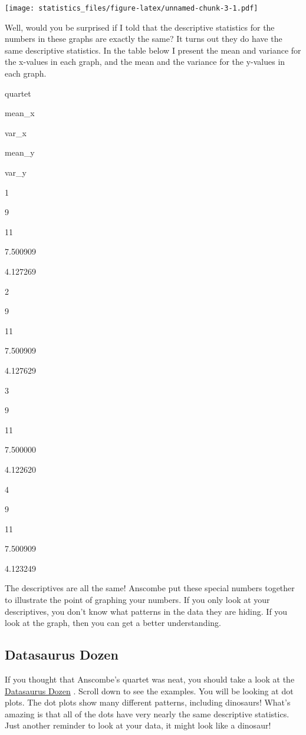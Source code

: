 \documentclass[]{book}
\begin{document}
\texttt{[image: statistics\_files/figure-latex/unnamed-chunk-3-1.pdf]}

Well, would you be surprised if I told that the descriptive statistics for the numbers in these graphs are exactly the same? It turns out they do have the same descriptive statistics. In the table below I present the mean and variance for the x-values in each graph, and the mean and the variance for the y-values in each graph.

quartet

mean\_x

var\_x

mean\_y

var\_y

1

9

11

7.500909

4.127269

2

9

11

7.500909

4.127629

3

9

11

7.500000

4.122620

4

9

11

7.500909

4.123249

The descriptives are all the same! Anscombe put these special numbers together to illustrate the point of graphing your numbers. If you only look at your descriptives, you don't know what patterns in the data they are hiding. If you look at the graph, then you can get a better understanding.

\hypertarget{datasaurus-dozen}{%
\subsection{Datasaurus Dozen}\label{datasaurus-dozen}}

If you thought that Anscombe's quartet was neat, you should take a look at the \href{https://www.autodeskresearch.com/publications/samestats}{Datasaurus Dozen} \citep{matejka2017same}. Scroll down to see the examples. You will be looking at dot plots. The dot plots show many different patterns, including dinosaurs! What's amazing is that all of the dots have very nearly the same descriptive statistics. Just another reminder to look at your data, it might look like a dinosaur!
\end{document}
